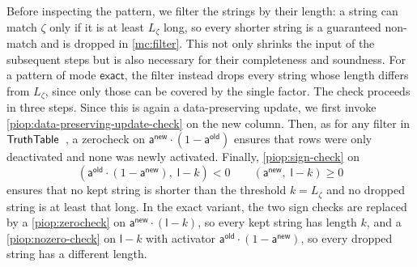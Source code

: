 \label{sec:length-filtering} Before inspecting the pattern, we filter the strings by their length: a string can match $\zeta$ only if it is at least $L_\zeta$ long, so every shorter string is a guaranteed non-match and is dropped in \cref{mc:filter}. This not only shrinks the input of the subsequent steps but is also necessary for their completeness and soundness. For a pattern of mode $\mathsf{exact}$, the filter instead drops every string whose length differs from $L_\zeta$, since only those can be covered by the single factor. The check proceeds in three steps. Since this is again a data-preserving update, we first invoke \cref{piop:data-preserving-update-check} on the new column. Then, as for any filter in $\mathsf{TruthTable}$~\cite{cryptoeprint:2026/1260}, a zerocheck on $\mathsf{a}^{\mathsf{new}}\cdot(1-\mathsf{a}^{\mathsf{old}})$ ensures that rows were only deactivated and none was newly activated. Finally, \cref{piop:sign-check} on
\begin{equation}
  \label{eq:fp-fn-len-filtering}
  (\mathsf{a}^{\mathsf{old}}\cdot(1-\mathsf{a}^{\mathsf{new}}),\; \mathsf{l}-k) < 0 \qquad (\mathsf{a}^{\mathsf{new}},\; \mathsf{l}-k) \geq 0
\end{equation}
ensures that no kept string is shorter than the threshold $k = L_\zeta$ and no dropped string is at least that long. In the exact variant, the two sign checks are replaced by a \cref{piop:zerocheck} on $\mathsf{a}^{\mathsf{new}}\cdot(\mathsf{l}-k)$, so every kept string has length $k$, and a \cref{piop:nozero-check} on $\mathsf{l}-k$ with activator $\mathsf{a}^{\mathsf{old}}\cdot(1-\mathsf{a}^{\mathsf{new}})$, so every dropped string has a different length.

